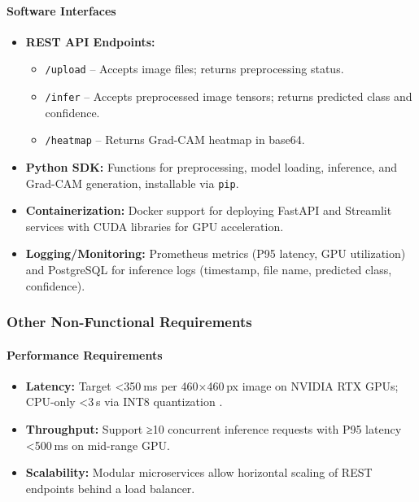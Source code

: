 \paragraph{Software Interfaces}
\begin{itemize}[leftmargin=*]
    \item \textbf{REST API Endpoints:} 
    \begin{itemize}[leftmargin=*]
        \item \texttt{/upload} – Accepts image files; returns preprocessing status.
        \item \texttt{/infer} – Accepts preprocessed image tensors; returns predicted class and confidence.
        \item \texttt{/heatmap} – Returns Grad-CAM heatmap in base64.
    \end{itemize}
    \item \textbf{Python SDK:} Functions for preprocessing, model loading, inference, and Grad-CAM generation, installable via \texttt{pip}.
    \item \textbf{Containerization:} Docker support for deploying FastAPI and Streamlit services with CUDA libraries for GPU acceleration.
    \item \textbf{Logging/Monitoring:} Prometheus metrics (P95 latency, GPU utilization) and PostgreSQL for inference logs (timestamp, file name, predicted class, confidence).
\end{itemize}

\subsubsection{Other Non-Functional Requirements}

\paragraph{Performance Requirements}
\begin{itemize}[leftmargin=*]
    \item \textbf{Latency:} Target <350 ms per 460×460 px image on NVIDIA RTX GPUs; CPU-only <3 s via INT8 quantization \cite{Staecker2021,Jacob2018}.
    \item \textbf{Throughput:} Support ≥10 concurrent inference requests with P95 latency <500 ms on mid-range GPU.
    \item \textbf{Scalability:} Modular microservices allow horizontal scaling of REST endpoints behind a load balancer.
\end{itemize}

